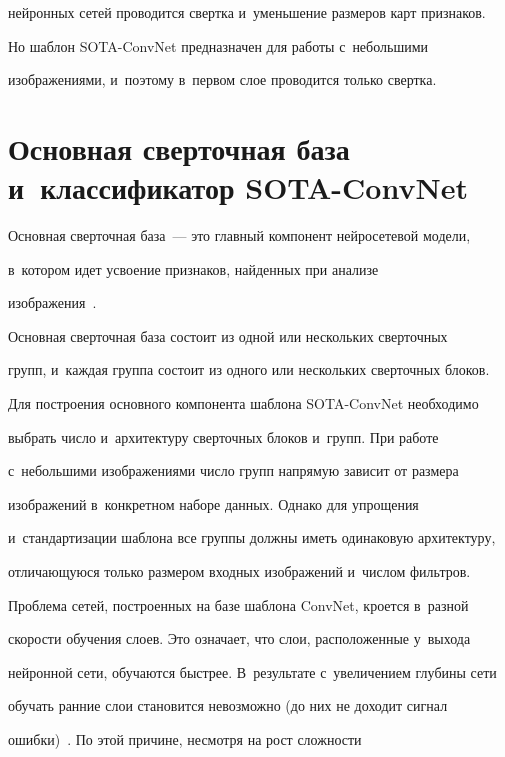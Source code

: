 нейронных сетей проводится свертка и~уменьшение размеров карт признаков. 


Но шаблон SOTA-ConvNet предназначен для работы с~небольшими 


изображениями, и~поэтому в~первом слое проводится только свертка.


  


  \section{Основная сверточная база и~классификатор SOTA-ConvNet}


  Основная сверточная база~--- это главный компонент нейросетевой модели, 


в~котором идет усвоение признаков, найденных при анализе 


изображения~\cite{9-ar}.


  


  Основная сверточная база состоит из одной или нескольких сверточных 


групп, и~каждая группа состоит из одного или нескольких сверточных блоков. 


  


  Для построения основного компонента шаблона SOTA-ConvNet необходимо 


выбрать число и~архитектуру сверточных блоков и~групп. При работе 


с~небольшими изображениями число групп напрямую зависит от размера 


изображений в~конкретном наборе данных. Однако для упрощения 


и~стандартизации шаблона все группы должны иметь одинаковую архитектуру, 


отличающуюся только размером входных изображений и~числом фильтров.


  


  Проблема сетей, построенных на базе шаблона ConvNet, кроется в~разной 


ско\-рости обуче\-ния слоев. Это означает, что слои, расположенные у~выхода 


нейронной сети, обуча\-ют\-ся быст\-рее. В~результате с~увеличением глубины сети 


обучать ранние слои становится невозможно (до них не доходит сигнал 


ошибки)~\cite{13-ar}. По этой причине, несмотря на рост слож\-ности 


